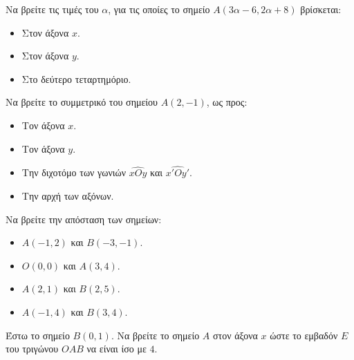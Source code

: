 \documentclass{../../presentation}
\begin{document}
\exercises

\begin{askisi}
  Να βρείτε τις τιμές του $α$, για τις οποίες το σημείο $Α(3α-6,2α+8)$ βρίσκεται:
  \begin{itemize}
    \item Στον άξονα $x$.
    \item Στον άξονα $y$.
    \item Στο δεύτερο τεταρτημόριο.
  \end{itemize}
\end{askisi}

\begin{askisi}
  Να βρείτε το συμμετρικό του σημείου $A(2,-1)$, ως προς:
  \begin{itemize}
    \item Τον άξονα $x$.
    \item Τον άξονα $y$.
    \item Την διχοτόμο των γωνιών $\widehat{xOy}$ και $\widehat{x'Oy'}$.
    \item Την αρχή των αξόνων.
  \end{itemize}
\end{askisi}

\begin{askisi}
  Να βρείτε την απόσταση των σημείων:
  \begin{itemize}
    \item $A(-1,2)$ και $B(-3,-1)$.
    \item $Ο(0,0)$ και $A(3,4)$.
    \item $A(2,1)$ και $B(2,5)$.
    \item $A(-1,4)$ και $B(3,4)$.
  \end{itemize}
\end{askisi}

\begin{askisi}
  Έστω το σημείο $Β(0,1)$. Να βρείτε το σημείο $A$ στον άξονα $x$ ώστε το εμβαδόν $Ε$ του τριγώνου $OAB$ να είναι ίσο με $4$.
\end{askisi}
\end{document}
